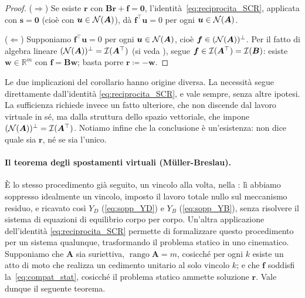 	\medskip

\begin{proof}
	($\Rightarrow$) Se esiste $\bm r$ con $\bm B\bm r+\bm f=\bm
	0$, l'identità~\eqref{eq:reciprocita_SCR}, applicata con
	$\bm s=\bm 0$ (cioè con $\bm u\in\mathcal{N}(\bm A)$), dà
	$\bm f^\top\bm u=0$ per ogni $\bm u\in\mathcal{N}(\bm A)$.
	
	($\Leftarrow$) Supponiamo $\bm f^\top\bm u=0$ per ogni
	$\bm u\in\mathcal{N}(\bm A)$, cioè $\bm f\in(\mathcal{N}(\bm A))^\perp$. Per
	il fatto di algebra lineare
	$(\mathcal{N}(\bm A))^\perp=\mathcal{I}(\bm A^\top)$ (si veda
	), segue $\bm
	f\in\mathcal{I}(\bm A^\top)=\mathcal{I}(\bm B)$:
	esiste $\bm w\in\mathbb R^m$ con $\bm f=\bm B\bm w$; basta
	porre $\bm r\coloneqq-\bm w$.
\end{proof}
\begin{oss}
	Le due implicazioni del corollario hanno origine diversa.
	La necessità segue direttamente dall'identità
	\eqref{eq:reciprocita_SCR}, e vale sempre, senza altre
	ipotesi. La sufficienza richiede invece un fatto ulteriore,
	che non discende dal lavoro virtuale in sé, ma dalla
	struttura dello spazio vettoriale, che impone
$(\mathcal{N}(\bm A))^\perp=\mathcal{I}(\bm A^\top)$. Notiamo
	infine che la conclusione è un'esistenza: non dice quale
	sia $\bm r$, né se sia l'unico.
\end{oss}
\paragraph{Il teorema degli spostamenti virtuali (Müller-Breslau).}
È lo stesso procedimento già seguito, un vincolo alla volta, nella
: lì abbiamo soppresso idealmente
un vincolo, imposto il lavoro totale nullo sul meccanismo
residuo, e ricavato così $Y_D$ (\eqref{eq:sopp_YD}) e $Y_B$
(\eqref{eq:sopp_YB}), senza risolvere il sistema di equazioni di
equilibrio corpo per corpo. Un'altra applicazione dell'identità
\eqref{eq:reciprocita_SCR} permette di formalizzare questo
procedimento per un sistema qualunque, trasformando il problema
statico in uno cinematico. Supponiamo che $\bm A$ sia suriettiva,
$\operatorname{rango}\bm A=m$, cosicché per ogni $k$ esiste un atto
di moto che realizza un cedimento unitario al solo vincolo $k$;
e che $\bm f$ soddisfi la~\eqref{eq:compat_stat}, cosicché il
problema statico ammette soluzione $\bm r$. Vale dunque il seguente teorema.


